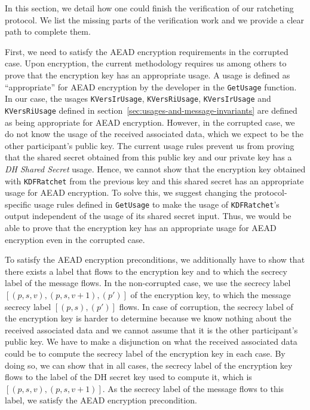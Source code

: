 In this section, we detail how one could finish the verification of our ratcheting protocol.
We list the missing parts of the verification work and we provide a clear path to complete them.

First, we need to satisfy the AEAD encryption requirements in the corrupted case.
Upon encryption, the current methodology requires us among others to prove that the encryption key has an appropriate usage.
A usage is defined as “appropriate” for AEAD encryption by the developer in the \texttt{GetUsage} function.
In our case, the usages \texttt{KVersIrUsage}, \texttt{KVersRiUsage}, \texttt{KVersIrUsage} and \texttt{KVersRiUsage} defined in section~\ref{sec:usages-and-message-invariants} are defined as being appropriate for AEAD encryption.
However, in the corrupted case, we do not know the usage of the received associated data, which we expect to be the other participant's public key.
The current usage rules prevent us from proving that the shared secret obtained from this public key and our private key has a \emph{DH Shared Secret} usage.
Hence, we cannot show that the encryption key obtained with \texttt{KDFRatchet} from the previous key and this shared secret has an appropriate usage for AEAD encryption.
To solve this, we suggest changing the protocol-specific usage rules defined in \texttt{GetUsage} to make the usage of \texttt{KDFRatchet}'s output independent of the usage of its shared secret input.
Thus, we would be able to prove that the encryption key has an appropriate usage for AEAD encryption even in the corrupted case.

To satisfy the AEAD encryption preconditions, we additionally have to show that there exists a label that flows to the encryption key and to which the secrecy label of the message flows.
In the non-corrupted case, we use the secrecy label $[(p,s,v),(p,s,v+1),(p')]$ of the encryption key, to which the message secrecy label $[(p,s),(p')]$ flows.
In case of corruption, the secrecy label of the encryption key is harder to determine because we know nothing about the received associated data and we cannot assume that it is the other participant's public key.
We have to make a disjunction on what the received associated data could be to compute the secrecy label of the encryption key in each case.
By doing so, we can show that in all cases, the secrecy label of the encryption key flows to the label of the DH secret key used to compute it, which is $[(p,s,v),(p,s,v+1)]$. As the secrecy label of the message flows to this label, we satisfy the AEAD encryption precondition.

